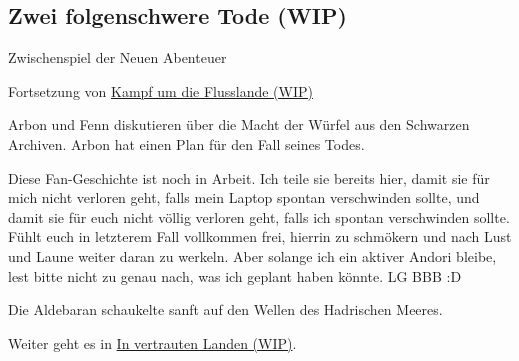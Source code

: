 
\begin{chapterbox}
    \chapter{Zwei folgenschwere Tode (WIP)}
    \label{wip-zwei-folgenschwere-tode}
    
    \begin{center}
        Zwischenspiel der Neuen Abenteuer

        Fortsetzung von \hyperref[wip-kampf-um-die-flusslande]{Kampf um die Flusslande (WIP)}
    \end{center}

    Arbon und Fenn diskutieren über die Macht der Würfel aus den Schwarzen Archiven. Arbon hat einen Plan für den Fall seines Todes.
\end{chapterbox}


Diese Fan-Geschichte ist noch in Arbeit. Ich teile sie bereits hier, damit sie für mich nicht verloren geht, falls mein Laptop spontan verschwinden sollte, und damit sie für euch nicht völlig verloren geht, falls ich spontan verschwinden sollte. Fühlt euch in letzterem Fall vollkommen frei, hierrin zu schmökern und nach Lust und Laune weiter daran zu werkeln. Aber solange ich ein aktiver Andori bleibe, lest bitte nicht zu genau nach, was ich geplant haben könnte. LG BBB :D




\newpage

Die Aldebaran schaukelte sanft auf den Wellen des Hadrischen Meeres.




\begin{commentbox}
    Weiter geht es in \hyperref[wip-in-vertrauten-landen]{In vertrauten Landen (WIP)}.
\end{commentbox}